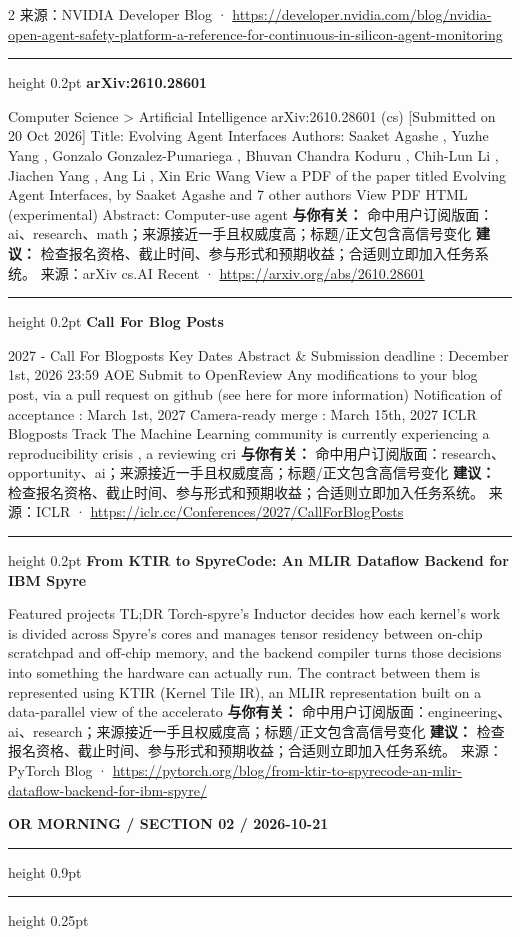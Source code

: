 \documentclass[10.5pt]{ctexart}
\begin{document}
\begin{multicols}{2}
{\footnotesize\color{ormuted} 来源：NVIDIA Developer Blog · \url{https://developer.nvidia.com/blog/nvidia-open-agent-safety-platform-a-reference-for-continuous-in-silicon-agent-monitoring}}
\vspace{2mm}
\hrule height 0.2pt
\vspace{2mm}
{\large\bfseries arXiv:2610.28601}\par
Computer Science > Artificial Intelligence arXiv:2610.28601 (cs) [Submitted on 20 Oct 2026] Title: Evolving Agent Interfaces Authors: Saaket Agashe , Yuzhe Yang , Gonzalo Gonzalez-Pumariega , Bhuvan Chandra Koduru , Chih-Lun Li , Jiachen Yang , Ang Li , Xin Eric Wang View a PDF of the paper titled Evolving Agent Interfaces, by Saaket Agashe and 7 other authors View PDF HTML (experimental) Abstract: Computer-use agent
\textbf{与你有关：} 命中用户订阅版面：ai、research、math；来源接近一手且权威度高；标题/正文包含高信号变化
\textbf{建议：} 检查报名资格、截止时间、参与形式和预期收益；合适则立即加入任务系统。
{\footnotesize\color{ormuted} 来源：arXiv cs.AI Recent · \url{https://arxiv.org/abs/2610.28601}}
\vspace{2mm}
\hrule height 0.2pt
\vspace{2mm}
{\large\bfseries Call For Blog Posts}\par
2027 - Call For Blogposts Key Dates Abstract \& Submission deadline : December 1st, 2026 23:59 AOE Submit to OpenReview Any modifications to your blog post, via a pull request on github (see here for more information) Notification of acceptance : March 1st, 2027 Camera-ready merge : March 15th, 2027 ICLR Blogposts Track The Machine Learning community is currently experiencing a reproducibility crisis , a reviewing cri
\textbf{与你有关：} 命中用户订阅版面：research、opportunity、ai；来源接近一手且权威度高；标题/正文包含高信号变化
\textbf{建议：} 检查报名资格、截止时间、参与形式和预期收益；合适则立即加入任务系统。
{\footnotesize\color{ormuted} 来源：ICLR · \url{https://iclr.cc/Conferences/2027/CallForBlogPosts}}
\vspace{2mm}
\hrule height 0.2pt
\vspace{2mm}
{\large\bfseries From KTIR to SpyreCode: An MLIR Dataflow Backend for IBM Spyre}\par
Featured projects TL;DR Torch-spyre’s Inductor decides how each kernel’s work is divided across Spyre’s cores and manages tensor residency between on-chip scratchpad and off-chip memory, and the backend compiler turns those decisions into something the hardware can actually run. The contract between them is represented using KTIR (Kernel Tile IR), an MLIR representation built on a data-parallel view of the accelerato
\textbf{与你有关：} 命中用户订阅版面：engineering、ai、research；来源接近一手且权威度高；标题/正文包含高信号变化
\textbf{建议：} 检查报名资格、截止时间、参与形式和预期收益；合适则立即加入任务系统。
{\footnotesize\color{ormuted} 来源：PyTorch Blog · \url{https://pytorch.org/blog/from-ktir-to-spyrecode-an-mlir-dataflow-backend-for-ibm-spyre/}}
\end{multicols}
\newpage
{\small\bfseries OR MORNING / SECTION 02 / 2026-10-21}
\vspace{2mm}
\hrule height 0.9pt
\vspace{1.5mm}
\hrule height 0.25pt
\vspace{4mm}
\end{document}
